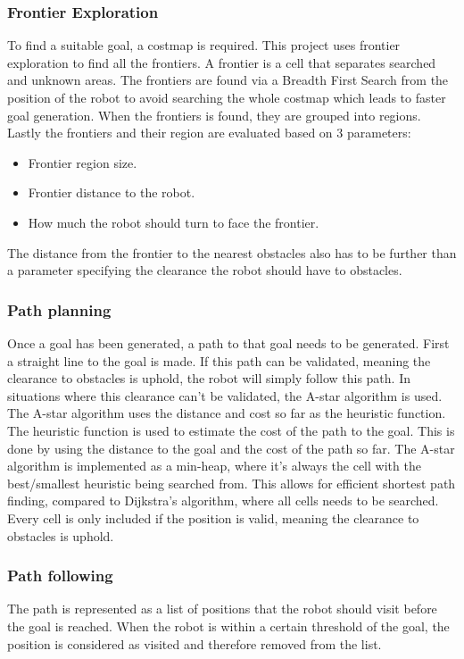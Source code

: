 \subsubsection{Frontier Exploration}\label{sec:frontier_exploration}
To find a suitable goal, a costmap is required.
This project uses frontier exploration to find all the frontiers. 
A frontier is a cell that separates searched and unknown areas. 
The frontiers are found via a Breadth First Search from the position of the robot  to avoid searching the whole costmap which leads to faster goal generation. When the frontiers is found, they are grouped into regions. 
Lastly the frontiers and their region are evaluated based on 3 parameters:
\begin{itemize}
  \item Frontier region size.
  \item Frontier distance to the robot.
  \item How much the robot should turn to face the frontier.
\end{itemize}
The distance from the frontier to the nearest obstacles also has to be further than a parameter specifying the clearance the robot should have to obstacles.


\subsubsection{Path planning}\label{sec:path_planning}
Once a goal has been generated, a path to that goal needs to be generated. First a straight line to the goal is made. If this path can be validated, meaning the clearance to obstacles is uphold, the robot will simply follow this path.
In situations where this clearance can't be validated, the A-star algorithm is used.
The A-star algorithm uses the distance and cost so far as the heuristic function. The heuristic function is used to estimate the cost of the path to the goal. This is done by using the distance to the goal and the cost of the path so far.
The A-star algorithm is implemented as a min-heap, where it's always the cell with the best/smallest heuristic being searched from. This allows for efficient shortest path finding, compared to Dijkstra's algorithm, where all cells needs to be searched. Every cell is only included if the position is valid, meaning the clearance to obstacles is uphold.

\subsubsection{Path following}\label{sec:path_following}
The path is represented as a list of positions that the robot should visit before the goal is reached. When the robot is within a certain threshold of the goal, the position is considered as visited and therefore removed from the list.

